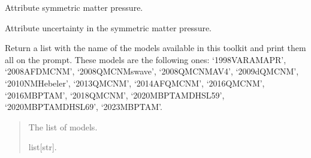 \documentclass[letterpaper,10pt,english]{sphinxmanual}
\begin{document}
\begin{fulllineitems}
\begin{fulllineitems}
\label{\detokenize{source/api/setup_micro:nucleardatapy.setup_micro.SetupMicro.sm_pre}}
\pysigstartsignatures
{}
\pysigstopsignatures
\sphinxAtStartPar
Attribute symmetric matter pressure.

\end{fulllineitems}


\begin{fulllineitems}
\label{\detokenize{source/api/setup_micro:nucleardatapy.setup_micro.SetupMicro.sm_pre_err}}
\pysigstartsignatures
{}
\pysigstopsignatures
\sphinxAtStartPar
Attribute uncertainty in the symmetric matter pressure.

\end{fulllineitems}


\end{fulllineitems}


\begin{fulllineitems}
\label{\detokenize{source/api/setup_micro:nucleardatapy.setup_micro.models_micro}}
\pysigstartsignatures
{}
\pysigstopsignatures
\sphinxAtStartPar
Return a list with the name of the models available in this toolkit and
print them all on the prompt. These models are the following ones:     ‘1998\sphinxhyphen{}VAR\sphinxhyphen{}AM\sphinxhyphen{}APR’, ‘2008\sphinxhyphen{}AFDMC\sphinxhyphen{}NM’, ‘2008\sphinxhyphen{}QMC\sphinxhyphen{}NM\sphinxhyphen{}swave’, ‘2008\sphinxhyphen{}QMC\sphinxhyphen{}NM\sphinxhyphen{}AV4’,     ‘2009\sphinxhyphen{}dQMC\sphinxhyphen{}NM’, ‘2010\sphinxhyphen{}NM\sphinxhyphen{}Hebeler’, ‘2013\sphinxhyphen{}QMC\sphinxhyphen{}NM’, ‘2014\sphinxhyphen{}AFQMC\sphinxhyphen{}NM’,     ‘2016\sphinxhyphen{}QMC\sphinxhyphen{}NM’, ‘2016\sphinxhyphen{}MBPT\sphinxhyphen{}AM’, ‘2018\sphinxhyphen{}QMC\sphinxhyphen{}NM’, ‘2020\sphinxhyphen{}MBPT\sphinxhyphen{}AM\sphinxhyphen{}DHSL59’,     ‘2020\sphinxhyphen{}MBPT\sphinxhyphen{}AM\sphinxhyphen{}DHSL69’, ‘2023\sphinxhyphen{}MBPT\sphinxhyphen{}AM’.
\begin{quote}\begin{description}
\sphinxAtStartPar
The list of models.

\sphinxAtStartPar
list{[}str{]}.

\end{description}\end{quote}

\end{fulllineitems}
\end{document}
